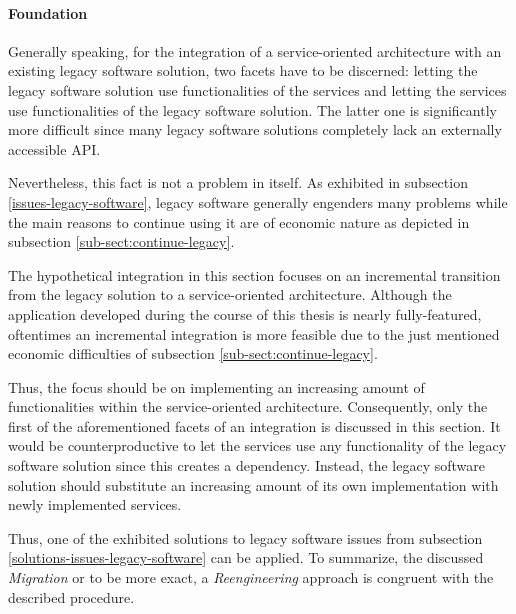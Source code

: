 \documentclass[12pt,a4paper,twoside]{report}
\begin{document}
\paragraph{Foundation}
Generally speaking, for the integration of a service-oriented architecture with
an existing legacy software solution, two facets have to be discerned:
letting the legacy software solution use functionalities of the services and
letting the services use functionalities of the legacy software solution.
The latter one is significantly more difficult since many legacy software solutions
completely lack an externally accessible API.

Nevertheless, this fact is not a problem in itself.
As exhibited in subsection \ref{issues-legacy-software}, legacy software generally
engenders many problems while the main reasons to continue using it are of
economic nature as depicted in subsection \ref{sub-sect:continue-legacy}.

The hypothetical integration in this section focuses on an incremental transition
from the legacy solution to a service-oriented architecture.
Although the application developed during the course of this thesis is nearly
fully-featured, oftentimes an incremental integration is more feasible due to
the just mentioned economic difficulties of subsection \ref{sub-sect:continue-legacy}.

Thus, the focus should be on implementing an increasing amount of functionalities
within the service-oriented architecture. Consequently, only the first of the
aforementioned facets of an integration is discussed in this section.
It would be counterproductive to let the services use any functionality of the
legacy software solution since this creates a dependency.
Instead, the legacy software solution should substitute an increasing amount
of its own implementation with newly implemented services.

Thus, one of the exhibited solutions to legacy software issues from subsection
\ref{solutions-issues-legacy-software} can be applied.
To summarize, the discussed \textit{Migration} or to be more exact,
a \textit{Reengineering} approach is congruent with the described procedure.
\end{document}
